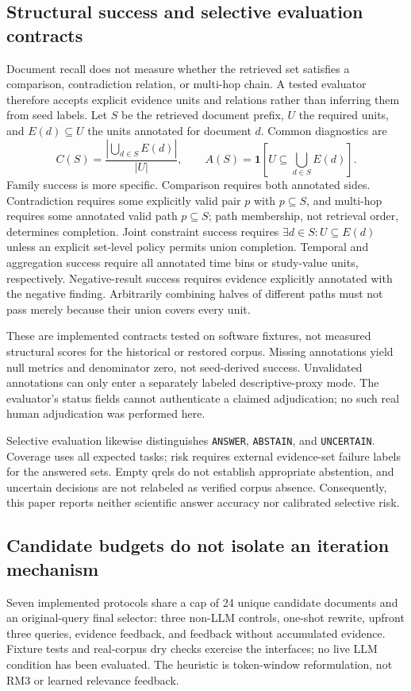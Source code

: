 \documentclass{article}
\newcommand{\ind}{\mathbf{1}}
\begin{document}
\subsection{Structural success and selective evaluation contracts}
\label{sec:structural}
Document recall does not measure whether the retrieved set satisfies a comparison, contradiction relation, or multi-hop chain. A tested evaluator therefore accepts explicit evidence units and relations rather than inferring them from seed labels. Let $S$ be the retrieved document prefix, $U$ the required units, and $E(d)\subseteq U$ the units annotated for document $d$. Common diagnostics are
\begin{equation}
 C(S)=\frac{|\bigcup_{d\in S}E(d)|}{|U|},\qquad
 A(S)=\ind\!\left[U\subseteq\bigcup_{d\in S}E(d)\right].
\end{equation}
Family success is more specific. Comparison requires both annotated sides. Contradiction requires some explicitly valid pair $p$ with $p\subseteq S$, and multi-hop requires some annotated valid path $p\subseteq S$; path membership, not retrieval order, determines completion. Joint constraint success requires $\exists d\in S:U\subseteq E(d)$ unless an explicit set-level policy permits union completion. Temporal and aggregation success require all annotated time bins or study-value units, respectively. Negative-result success requires evidence explicitly annotated with the negative finding. Arbitrarily combining halves of different paths must not pass merely because their union covers every unit.

These are implemented contracts tested on software fixtures, not measured structural scores for the historical or restored corpus. Missing annotations yield null metrics and denominator zero, not seed-derived success. Unvalidated annotations can only enter a separately labeled descriptive-proxy mode. The evaluator's status fields cannot authenticate a claimed adjudication; no such real human adjudication was performed here.

Selective evaluation likewise distinguishes \texttt{ANSWER}, \texttt{ABSTAIN}, and \texttt{UNCERTAIN}. Coverage uses all expected tasks; risk requires external evidence-set failure labels for the answered sets. Empty qrels do not establish appropriate abstention, and uncertain decisions are not relabeled as verified corpus absence. Consequently, this paper reports neither scientific answer accuracy nor calibrated selective risk.

\subsection{Candidate budgets do not isolate an iteration mechanism}
Seven implemented protocols share a cap of 24 unique candidate documents and an original-query final selector: three non-LLM controls, one-shot rewrite, upfront three queries, evidence feedback, and feedback without accumulated evidence. Fixture tests and real-corpus dry checks exercise the interfaces; no live LLM condition has been evaluated. The heuristic is token-window reformulation, not RM3 or learned relevance feedback.
\end{document}
